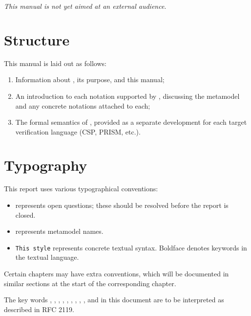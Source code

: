 
\emph{This manual is not yet aimed at an external audience}.

\section*{Structure}
This manual is laid out as follows:

\begin{enumerate}
\item
  Information about \langname, its purpose, and this manual;
\item
  An introduction to each notation supported by \langname, discussing the
  metamodel and any concrete notations attached to each;
\item
  The formal semantics of \langname, provided as a separate development for
  each target verification language (CSP, PRISM, etc.).
\end{enumerate}

\section*{Typography}
This report uses various typographical conventions:

\begin{itemize}
\item
	 represents open questions; these should be
	resolved before the report is closed.
\item
	 represents metamodel names.
\item
	\texttt{This style} represents concrete textual syntax.  Boldface
	denotes keywords in the textual language.
\end{itemize}

Certain chapters may have extra conventions, which will be documented in
similar sections at the start of the corresponding chapter.

The key words \rfcmust, \rfcmustnot, \rfcrequired, \rfcshall, \rfcshallnot,
\rfcshould, \rfcshouldnot, \rfcrecommended, \rfcmay, and \rfcoptional{} in this
document are to be interpreted as described in RFC 2119.

